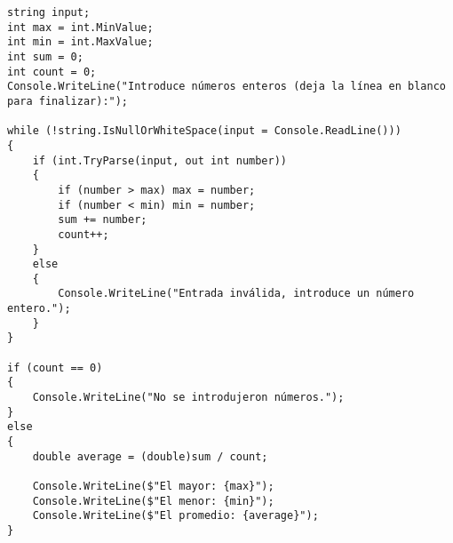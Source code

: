 \begin{lstlisting}
string input;
int max = int.MinValue;
int min = int.MaxValue;
int sum = 0;
int count = 0;
Console.WriteLine("Introduce números enteros (deja la línea en blanco para finalizar):");

while (!string.IsNullOrWhiteSpace(input = Console.ReadLine()))
{
    if (int.TryParse(input, out int number))
    {
        if (number > max) max = number;
        if (number < min) min = number;
        sum += number;
        count++;
    }
    else
    {
        Console.WriteLine("Entrada inválida, introduce un número entero.");
    }
}
    
if (count == 0)
{
    Console.WriteLine("No se introdujeron números.");
}
else
{
    double average = (double)sum / count;

    Console.WriteLine($"El mayor: {max}");
    Console.WriteLine($"El menor: {min}");
    Console.WriteLine($"El promedio: {average}");
}
\end{lstlisting}